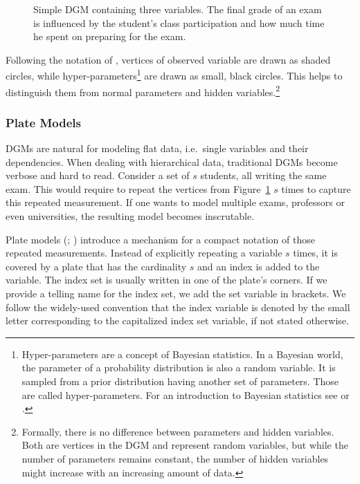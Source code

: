 \begin{figure}[t]
	\begin{center}
    	\scalebox{\tikzScale}{\adjustTikzSize }
	\end{center}
\caption[Simple directed graphical model containing three variables.]{Simple DGM containing three variables. The final grade of an exam is influenced by the student's class participation and how much time he spent on preparing for the exam.}
		\label{fig:simple_dgm}
\end{figure}

Following the notation of \textcite{bishop2006pattern}, vertices of observed variable are drawn as shaded circles, while hyper-parameters\footnote{Hyper-parameters are a concept of Bayesian statistics. In a Bayesian world, the parameter of a probability distribution is also a random variable. It is sampled from a prior distribution having another set of parameters. Those are called hyper-parameters. For an introduction to Bayesian statistics see \textcite{gelman2013bayesian} or \textcite{kruschke2010doing}.} are drawn as small, black circles. This helps to distinguish them from normal parameters and hidden variables.\footnote{Formally, there is no difference between parameters and hidden variables. Both are vertices in the DGM and represent random variables, but while the number of parameters remains constant, the number of hidden variables might increase with an increasing amount of data.}

\subsubsection{Plate Models}

DGMs are natural for modeling flat data, i.e.~single variables and their dependencies. When dealing with hierarchical data, traditional DGMs become verbose and hard to read. Consider a set of $s$ students, all writing the same exam. This would require to repeat the vertices from Figure~\ref{fig:simple_dgm} $s$ times to capture this repeated measurement. If one wants to model multiple exams, professors or even universities, the resulting model becomes inscrutable.

Plate models (\cite{buntine1994operations}; \cite{gilks1994language}) introduce a mechanism for a compact notation of those repeated measurements. Instead of explicitly repeating a variable $s$ times, it is covered by a plate that has the cardinality $s$ and an index is added to the variable. The index set is usually written in one of the plate's corners. If we provide a telling name for the index set, we add the set variable in brackets. We follow the widely-used convention that the index variable is denoted by the small letter corresponding to the capitalized index set variable, if not stated otherwise.

